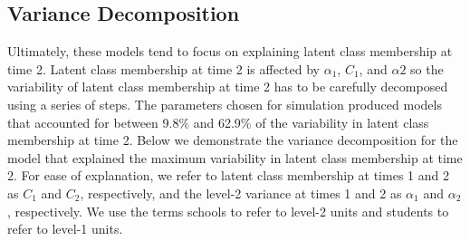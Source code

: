 \documentclass[man, noextraspace, floatsintext, 12pt]{apa7}
\begin{document}
\subsection*{Variance Decomposition}
Ultimately, these models tend to focus on explaining latent class membership at time 2. 
Latent class membership at time 2 is affected by $\alpha_1$, $C_1$, and $\alpha2$ so the variability of latent class membership at time 2 has to be carefully decomposed using a series of steps. 
The parameters chosen for simulation produced models that accounted for between 9.8\% and 62.9\% of the variability in latent class membership at time 2. 
Below we demonstrate the variance decomposition for the model that explained the maximum variability in latent class membership at time 2. 
For ease of explanation, we refer to latent class membership at times 1 and 2 as $C_1$ and $C_2$, respectively, and  the level-2 variance at times 1 and 2 as $\alpha_1$ and $\alpha_2$, respectively. 
We use the terms schools to refer to level-2 units and students to refer to level-1 units.
\end{document}
